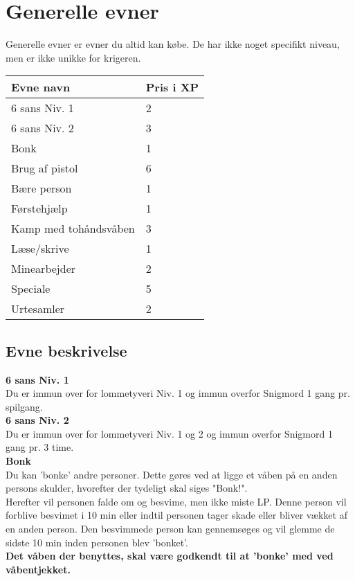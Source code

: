 \chapter*{Generelle evner}

Generelle evner er evner du altid kan købe. De har ikke noget specifikt niveau, men er ikke unikke for krigeren.

\begin{table}[H]
    \centering
    \begin{tabular}{|p{}|p{}|}
    \rowcolor{cerulean!80}
    \hline
        Evne navn & Pris i XP \\\hline
         6 sans Niv. 1 & 2\\\hline
         6 sans Niv. 2 & 3\\\hline
         Bonk & 1 \\\hline
         Brug af pistol & 6\\\hline
         Bære person & 1 \\\hline
         Førstehjælp & 1\\\hline
         Kamp med tohåndsvåben & 3\\\hline
         Læse/skrive & 1\\\hline
         Minearbejder & 2\\\hline
         Speciale & 5\\\hline
         Urtesamler & 2\\\hline
    \end{tabular}
\end{table}

\section*{Evne beskrivelse}

\textbf{6 sans Niv. 1}\\
Du er immun over for lommetyveri Niv. 1 og immun overfor Snigmord 1 gang pr. spilgang.\\

\textbf{6 sans Niv. 2}\\
Du er immun over for lommetyveri Niv. 1 og 2 og immun overfor Snigmord 1 gang pr. 3 time.\\

\textbf{Bonk}\\
Du kan 'bonke' andre personer. Dette gøres ved at ligge et våben på en anden persons skulder, hvorefter der tydeligt skal siges "Bonk!".\\
Herefter vil personen falde om og besvime, men ikke miste LP. Denne person vil forblive besvimet i 10 min eller indtil personen tager skade eller bliver vækket af en anden person. Den besvimmede person kan gennemsøges og vil glemme de sidste 10 min inden personen blev 'bonket'.\\
\textbf{Det våben der benyttes, skal være godkendt til at 'bonke' med ved våbentjekket.}\\

